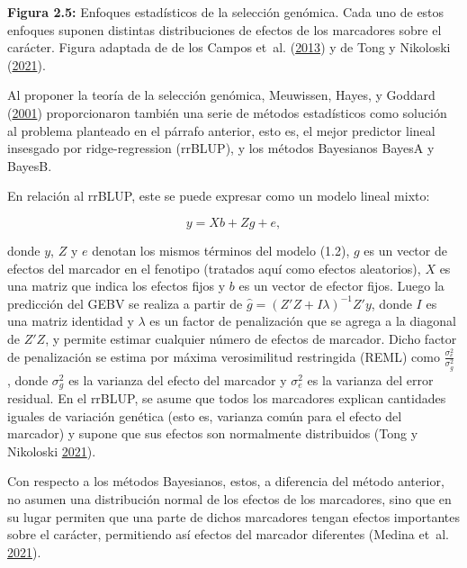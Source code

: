 \documentclass[11pt,spanish,a4paper,oneside,]{book} %
\begin{document}
\noindent 
\textbf{Figura 2.5:} Enfoques estadísticos de la selección genómica. Cada uno de estos enfoques suponen distintas distribuciones de efectos de los marcadores sobre el carácter. Figura adaptada de de los Campos et~al. (\protect\hyperlink{ref-cite:31}{2013}) y de Tong y Nikoloski (\protect\hyperlink{ref-cite:7}{2021}).

\hspace*{1em}

Al proponer la teoría de la selección genómica, Meuwissen, Hayes, y Goddard (\protect\hyperlink{ref-cite:8}{2001}) proporcionaron también una serie de métodos estadísticos como solución al problema planteado en el párrafo anterior, esto es, el mejor predictor lineal insesgado por ridge-regression (rrBLUP), y los métodos Bayesianos BayesA y BayesB.

En relación al rrBLUP, este se puede expresar como un modelo lineal mixto:

\begin{equation}
y = Xb + Zg + e,
\end{equation}

donde \(y\), \(Z\) y \(e\) denotan los mismos términos del modelo (1.2), \(g\) es un vector de efectos del marcador en el fenotipo (tratados aquí como efectos aleatorios), \(X\) es una matriz que indica los efectos fijos y \(b\) es un vector de efector fijos. Luego la predicción del GEBV se realiza a partir de \(\hat{g} = (Z'Z + I \lambda)^{- 1} Z'y\), donde \(I\) es una matriz identidad y \(\lambda\) es un factor de penalización que se agrega a la diagonal de \(Z'Z\), y permite estimar cualquier número de efectos de marcador. Dicho factor de penalización se estima por máxima verosimilitud restringida (REML) como \(\frac{\sigma^{2}_{e}} {\sigma^{2}_{g}}\) , donde \(\sigma^{2}_{g}\) es la varianza del efecto del marcador y \(\sigma^{2}_{e}\) es la varianza del error residual. En el rrBLUP, se asume que todos los marcadores explican cantidades iguales de variación genética (esto es, varianza común para el efecto del marcador) y supone que sus efectos son normalmente distribuidos (Tong y Nikoloski \protect\hyperlink{ref-cite:7}{2021}).

Con respecto a los métodos Bayesianos, estos, a diferencia del método anterior, no asumen una distribución normal de los efectos de los marcadores, sino que en su lugar permiten que una parte de dichos marcadores tengan efectos importantes sobre el carácter, permitiendo así efectos del marcador diferentes (Medina et~al. \protect\hyperlink{ref-cite:38}{2021}).
\end{document}
